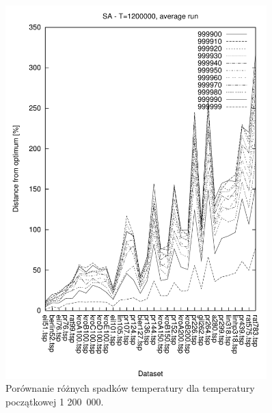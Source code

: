 \begin{figure}
\begin{center}
\includegraphics[width=0.9\textwidth]{wykresy/sa/sa_1200000_av}
\end{center}
\caption{Porównanie różnych spadków temperatury dla temperatury początkowej 1 200~000.}
\label{sa_1200000_av}
\end{figure}


